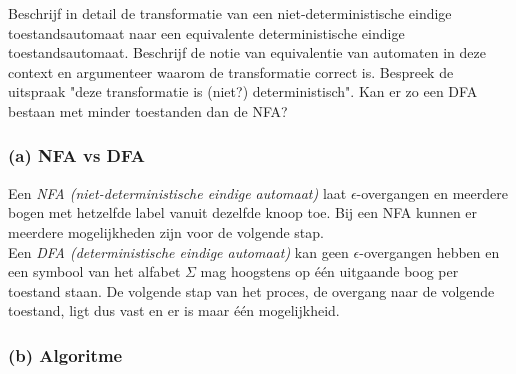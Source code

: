 \begin{question}
Beschrijf in detail de transformatie van een niet-deterministische eindige toestandsautomaat naar een equivalente deterministische eindige toestandsautomaat. Beschrijf de notie van equivalentie van automaten in deze context en argumenteer waarom de transformatie correct is. Bespreek de uitspraak "deze transformatie is (niet?) deterministisch". Kan er zo een DFA bestaan met minder toestanden dan de NFA?
\end{question}

\subsubsection*{(a) NFA vs DFA}

Een \emph{NFA (niet-deterministische eindige automaat)} laat $\epsilon$-overgangen en meerdere bogen met hetzelfde label vanuit dezelfde knoop toe. Bij een NFA kunnen er meerdere mogelijkheden zijn voor de volgende stap.  \\
Een \emph{DFA (deterministische eindige automaat)} kan geen $\epsilon$-overgangen hebben en een symbool van het alfabet $\Sigma$ mag hoogstens op \'e\'en  uitgaande boog per toestand staan. De volgende stap van het proces, de overgang naar de volgende toestand, ligt dus vast en er is maar \'e\'en mogelijkheid.

\subsubsection*{(b) Algoritme}

